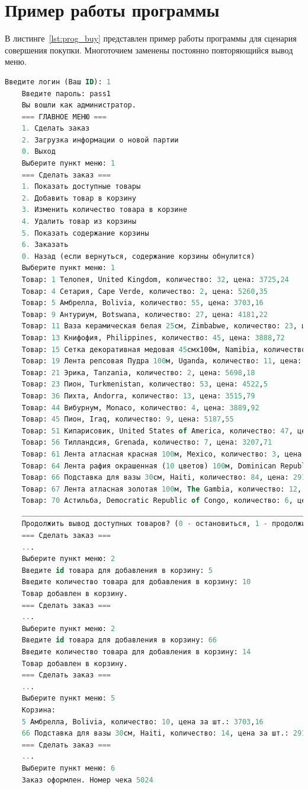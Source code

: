 \section{Пример работы программы}
В листинге~\ref{lst:prog_buy} представлен пример работы программы для сценария совершения покупки. Многоточием заменены постоянно повторяющийся вывод меню.
\begin{lstlisting}[label=lst:prog_buy, caption=Совершение покупки, language=SQL]
	Введите логин (Ваш ID): 1
	Введите пароль: pass1
	Вы вошли как администратор.
	=== ГЛАВНОЕ МЕНЮ ===
	1. Сделать заказ
	2. Загрузка информации о новой партии
	0. Выход
	Выберите пункт меню: 1
	=== Сделать заказ ===
	1. Показать доступные товары
	2. Добавить товар в корзину
	3. Изменить количество товара в корзине
	4. Удалить товар из корзины
	5. Показать содержание корзины
	6. Заказать
	0. Назад (если вернуться, содержание корзины обнулится)
	Выберите пункт меню: 1
	Товар: 1 Телопея, United Kingdom, количество: 32, цена: 3725,24
	Товар: 4 Сетария, Cape Verde, количество: 2, цена: 5260,35
	Товар: 5 Амбрелла, Bolivia, количество: 55, цена: 3703,16
	Товар: 9 Антуриум, Botswana, количество: 27, цена: 4181,22
	Товар: 11 Ваза керамическая белая 25см, Zimbabwe, количество: 23, цена: 6872,71
	Товар: 13 Книфофия, Philippines, количество: 45, цена: 3888,72
	Товар: 15 Сетка декоративная медовая 45смx100м, Namibia, количество: 60, цена: 4255,04
	Товар: 19 Лента репсовая Пудра 100м, Uganda, количество: 11, цена: 4667,08
	Товар: 21 Эрика, Tanzania, количество: 2, цена: 5698,18
	Товар: 23 Пион, Turkmenistan, количество: 53, цена: 4522,5
	Товар: 36 Пихта, Andorra, количество: 13, цена: 3515,79
	Товар: 44 Вибурнум, Monaco, количество: 4, цена: 3889,92
	Товар: 45 Пион, Iraq, количество: 9, цена: 5187,55
	Товар: 51 Кипарисовик, United States of America, количество: 47, цена: 4526,53
	Товар: 56 Тилландсия, Grenada, количество: 7, цена: 3207,71
	Товар: 61 Лента атласная красная 100м, Mexico, количество: 3, цена: 3909,84
	Товар: 64 Лента рафия окрашенная (10 цветов) 100м, Dominican Republic, количество: 1, цена: 5139,66
	Товар: 66 Подставка для вазы 30см, Haiti, количество: 84, цена: 2917,62
	Товар: 67 Лента атласная золотая 100м, The Gambia, количество: 12, цена: 3458,98
	Товар: 70 Астильба, Democratic Republic of Congo, количество: 6, цена: 3005,13
	______________________________________________________________________
	Продолжить вывод доступных товаров? (0 - остановиться, 1 - продолжить): 0
	=== Сделать заказ ===
	...
	Выберите пункт меню: 2
	Введите id товара для добавления в корзину: 5
	Введите количество товара для добавления в корзину: 10
	Товар добавлен в корзину.
	=== Сделать заказ ===
	...
	Выберите пункт меню: 2
	Введите id товара для добавления в корзину: 66
	Введите количество товара для добавления в корзину: 14
	Товар добавлен в корзину.
	=== Сделать заказ ===
	...
	Выберите пункт меню: 5
	Корзина:
	5 Амбрелла, Bolivia, количество: 10, цена за шт.: 3703,16
	66 Подставка для вазы 30см, Haiti, количество: 14, цена за шт.: 2917,62
	=== Сделать заказ ===
	...
	Выберите пункт меню: 6
	Заказ оформлен. Номер чека 5024
\end{lstlisting}
